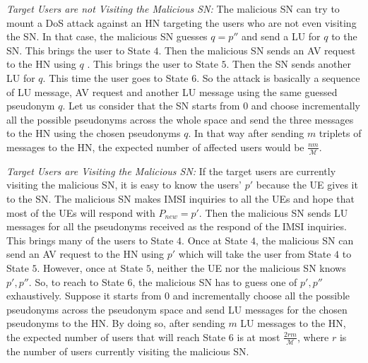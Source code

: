 \documentclass{llncs} %
\begin{document}
\textit{Target Users are not Visiting the Malicious SN:} The malicious SN can try to mount a DoS attack against an HN targeting the users who are not even visiting the SN. In that case, the malicious SN guesses $q=p''$ and send a LU for $q$ to the SN. This brings the user to State $4$. Then the malicious SN sends an AV request to the HN using $q$ . This brings the user to State $5$. Then the SN sends another LU for $q$. This time the user goes to State $6$. So the attack is basically a sequence of LU message, AV request and another LU message using the same guessed pseudonym $q$. Let us consider that the SN starts from $0$ and choose incrementally all the possible pseudonyms across the whole space and send the three messages to the HN using the chosen pseudonyms $q$. In that way after sending $m$ triplets of messages to the HN, the expected number of affected users would be $\frac{nm}{\mathcal{M}}$. %

\textit{Target Users are Visiting the Malicious SN:} If the target users are currently visiting the malicious SN, it is easy to know the users' $p'$ because the UE gives it to the SN. The malicious SN makes IMSI inquiries to all the UEs and hope that most of the UEs will respond with $P_{new} = p'$. Then the malicious SN sends LU messages for all the pseudonyms received as the respond of the IMSI inquiries. This brings many of the users to State $4$.  Once at State $4$, the malicious SN can send an AV request to the HN using $p'$ which will take the user from State $4$ to State $5$. However, once at State $5$, neither the UE nor the malicious SN knows $p',p''$. So, to reach to State $6$, the malicious SN has to guess one of $p',p''$ exhaustively. Suppose it starts from $0$ and incrementally choose all the possible pseudonyms across the pseudonym space and send LU messages for the chosen pseudonyms to the HN. By doing so, after sending $m$ LU messages to the HN, the expected number of users that will reach State $6$ is at most $\frac{2rm}{\mathcal{M}}$, where $r$ is the number of users currently visiting the malicious SN. %
\end{document}
